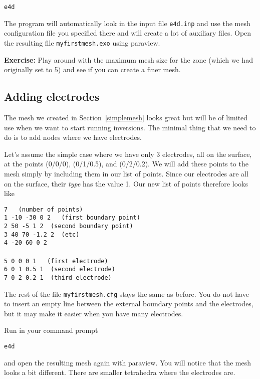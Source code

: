\documentclass[11pt]{article}
\begin{document}
\qquad \verb+e4d+

The program will automatically look in the input file \verb#e4d.inp#
and use the mesh configuration file you specified there and will
create a lot of auxiliary files. Open the resulting file
\verb#myfirstmesh.exo# using paraview.


\textbf{Exercise:} Play around with the maximum mesh size for the zone
(which we had originally set to 5) and see if you can create a finer
mesh.


\subsection{Adding electrodes}

The mesh we created in Section~\ref{simplemesh} looks great but will
be of limited use when we want to start running inversions. The
minimal thing that we need to do is to add nodes where we have
electrodes.

Let's assume the simple case where we have only 3 electrodes, all on
the surface, at the points (0/0/0), (0/1/0.5), and (0/2/0.2). We will
add these points to the mesh simply by including them in our list of
points. Since our electrodes are all on the surface, their \emph{type}
has the value 1. Our new list of points therefore looks like

\verb+7   (number of points)+\\
\verb+1 -10 -30 0 2   (first boundary point)+\\
\verb+2 50 -5 1 2  (second boundary point)+\\
\verb+3 40 70 -1.2 2  (etc)+\\
\verb+4 -20 60 0 2+\\
\verb++\\
\verb+5 0 0 0 1   (first electrode)+\\
\verb+6 0 1 0.5 1  (second electrode)+\\
\verb+7 0 2 0.2 1  (third electrode)+

The rest of the file \verb+myfirstmesh.cfg+ stays the same as
before. You do not have to insert an empty line between the external
boundary points and the electrodes, but it may make it easier when you
have many electrodes. 

Run in your command prompt

\qquad \verb+e4d+

and open the resulting mesh again with paraview. You will notice that
the mesh looks a bit different. There are smaller tetrahedra where the
electrodes are.
\end{document}
